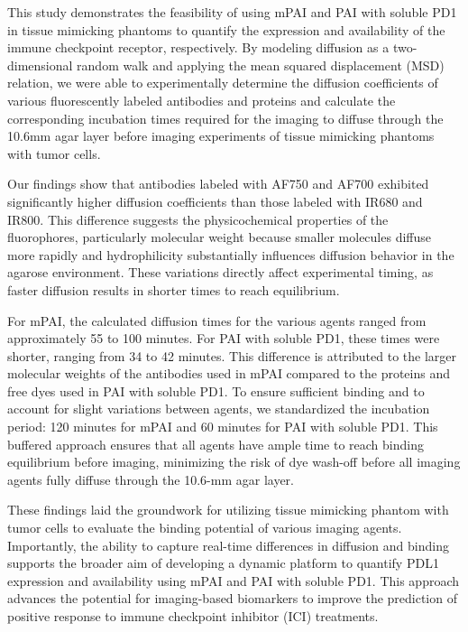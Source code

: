 This study demonstrates the feasibility of using mPAI and PAI with soluble PD1 in tissue mimicking phantoms to quantify the expression and availability of the immune checkpoint receptor, respectively. By modeling diffusion as a two-dimensional random walk and applying the mean squared displacement (MSD) relation, we were able to experimentally determine the diffusion coefficients of various fluorescently labeled antibodies and proteins and calculate the corresponding incubation times required for the imaging to diffuse through the 10.6mm agar layer before imaging experiments
of tissue mimicking phantoms with tumor cells.

Our findings show that antibodies labeled with AF750 and AF700 exhibited significantly higher diffusion coefficients than those labeled with IR680 and IR800. This difference suggests the physicochemical properties of the fluorophores, particularly molecular weight because smaller molecules diffuse more rapidly and hydrophilicity substantially influences diffusion behavior in the agarose environment. 
These variations directly affect experimental timing, as faster diffusion results in shorter times to reach equilibrium.

For mPAI, the calculated diffusion times for the various agents ranged from approximately 55 to 100 minutes. For PAI with soluble PD1, 
these times were shorter, ranging from 34 to 42 minutes. This difference is attributed to the larger molecular weights of the antibodies used in mPAI compared to the proteins and free dyes used in PAI with soluble PD1. To ensure sufficient binding and to account for slight variations between agents, we standardized the incubation period: 120 minutes for mPAI and 60 minutes for PAI with soluble PD1. This buffered approach ensures that all agents have ample time to reach binding equilibrium before imaging, minimizing the risk of dye wash-off before all imaging agents fully diffuse through the 10.6-mm agar layer.

These findings laid the groundwork for utilizing tissue mimicking phantom with tumor cells to evaluate the binding potential of various imaging agents. Importantly, the ability to capture real-time differences in diffusion and binding supports the broader aim of developing a dynamic platform to quantify PDL1 expression and availability using mPAI and PAI with soluble PD1. This approach advances
the potential for imaging-based biomarkers to improve the prediction of positive response to immune checkpoint inhibitor (ICI) treatments.
